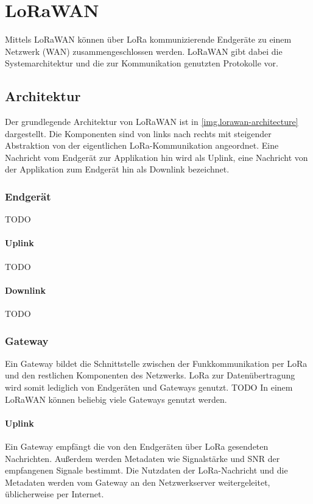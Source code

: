 \chapter{LoRaWAN}
Mittels LoRaWAN können über LoRa kommunizierende Endgeräte zu einem Netzwerk (WAN) zusammengeschlossen werden.
LoRaWAN gibt dabei die Systemarchitektur und die zur Kommunikation genutzten Protokolle vor.


\section{Architektur}
Der grundlegende Architektur von LoRaWAN ist in \autoref{img.lorawan-architecture} dargestellt.
Die Komponenten sind von links nach rechts mit steigender Abstraktion von der eigentlichen LoRa-Kommunikation angeordnet.
Eine Nachricht vom Endgerät zur Applikation hin wird als \gls{Uplink}, eine Nachricht von der Applikation zum Endgerät hin als \gls{Downlink} bezeichnet.
\cite{lorawanarchitecture}


\subsection{Endgerät}
TODO 

\subsubsection{Uplink}
TODO

\subsubsection{Downlink}
TODO


\subsection{Gateway}
Ein Gateway bildet die Schnittstelle zwischen der Funkkommunikation per LoRa und den restlichen Komponenten des Netzwerks.
LoRa zur Datenübertragung wird somit lediglich von Endgeräten und Gateways genutzt.
TODO
In einem LoRaWAN können beliebig viele Gateways genutzt werden.

\subsubsection{Uplink}
Ein Gateway empfängt die von den Endgeräten über LoRa gesendeten Nachrichten.
Außerdem werden Metadaten wie Signalstärke und \gls{SNR} der empfangenen Signale bestimmt.
Die Nutzdaten der LoRa-Nachricht und die Metadaten werden vom Gateway an den Netzwerkserver weitergeleitet, üblicherweise per Internet.

